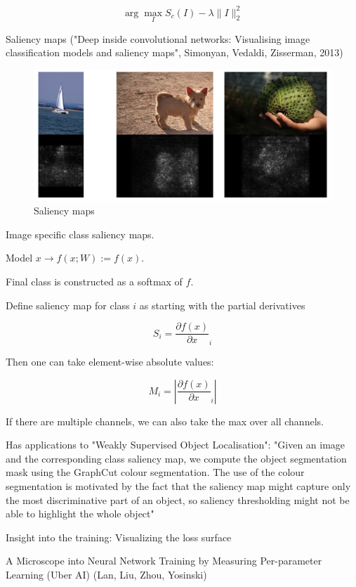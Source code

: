 \documentclass[english]{article}
\begin{document}
$$\arg\max_I
S_c(I) - \lambda \|I\|_2^2 
$$

\item  Saliency maps ("Deep inside convolutional networks: Visualising image classification models and saliency maps", Simonyan, Vedaldi, Zisserman, 2013)


\begin{figure}
  \centering
  \includegraphics[width=\textwidth]{saliency.png}
  \caption{Saliency maps}
  \label{saliency}
\end{figure}


Image specific class saliency maps. 

Model $x \to f(x;W):=f(x)$. 

Final class is constructed as a softmax of $f$.

Define saliency map for class $i$ as starting with the partial derivatives

$$S_i = \frac{\partial f(x)}{\partial x}_i$$

Then one can take element-wise absolute values: 

$$M_i = |\frac{\partial f(x)}{\partial x}_i|$$

If there are multiple channels, we can also take the max over all channels.

Has applications to "Weakly Supervised Object Localisation":  "Given an image and the corresponding class saliency map, we compute the object segmentation mask
using the GraphCut colour segmentation. The use of the colour segmentation is motivated by the
fact that the saliency map might capture only the most discriminative part of an object, so saliency
thresholding might not be able to highlight the whole object"



\item  Insight into the training: Visualizing the loss surface



\item A Microscope into Neural Network
Training by Measuring Per-parameter Learning (Uber AI) (Lan, Liu, Zhou, Yosinski)
\end{document}
